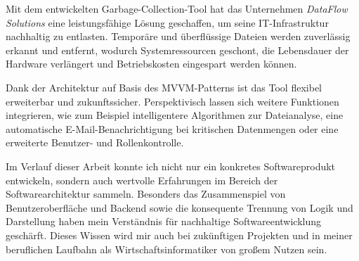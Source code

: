 Mit dem entwickelten Garbage-Collection-Tool hat das Unternehmen \textit{DataFlow Solutions} eine leistungsfähige Lösung geschaffen, um seine IT-Infrastruktur nachhaltig zu entlasten. Temporäre und überflüssige Dateien werden zuverlässig erkannt und entfernt, wodurch Systemressourcen geschont, die Lebensdauer der Hardware verlängert und Betriebskosten eingespart werden können.

Dank der Architektur auf Basis des MVVM-Patterns ist das Tool flexibel erweiterbar und zukunftssicher. Perspektivisch lassen sich weitere Funktionen integrieren, wie zum Beispiel intelligentere Algorithmen zur Dateianalyse, eine automatische E-Mail-Benachrichtigung bei kritischen Datenmengen oder eine erweiterte Benutzer- und Rollenkontrolle.

Im Verlauf dieser Arbeit konnte ich nicht nur ein konkretes Softwareprodukt entwickeln, sondern auch wertvolle Erfahrungen im Bereich der Softwarearchitektur sammeln. Besonders das Zusammenspiel von Benutzeroberfläche und Backend sowie die konsequente Trennung von Logik und Darstellung haben mein Verständnis für nachhaltige Softwareentwicklung geschärft. Dieses Wissen wird mir auch bei zukünftigen Projekten und in meiner beruflichen Laufbahn als Wirtschaftsinformatiker von großem Nutzen sein.
